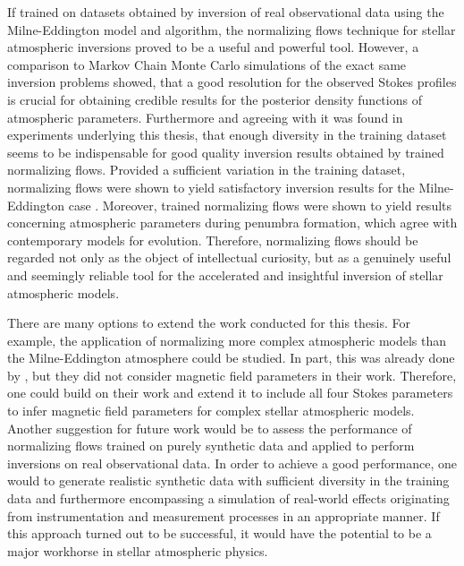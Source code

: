 \documentclass[a4paper,11pt]{report}
\def\fc#1{{\color{black}{#1}}} %
\def\lk#1{{\color{black}{#1}}}
\begin{document}
If trained on datasets obtained by inversion of real observational data using the Milne-Eddington model and algorithm, the normalizing flows technique for stellar atmospheric inversions proved to be a useful and powerful tool. However, a comparison to Markov Chain Monte Carlo simulations of the exact same inversion problems showed, that a good resolution for the observed Stokes profiles is crucial for obtaining credible results for the posterior density functions of atmospheric parameters. Furthermore and agreeing with \cite[p.12]{DiazBaso.2022} it was found in experiments underlying this thesis, that enough diversity in the training dataset seems to be indispensable for good quality inversion results obtained by trained normalizing flows. Provided a sufficient variation in the training dataset, normalizing flows were shown to yield satisfactory inversion results for the Milne-Eddington case \lk{including magnetic field properties}. Moreover, trained normalizing flows were shown to yield results concerning atmospheric parameters during penumbra formation, which agree with contemporary models for \lk{sunspot} evolution. \fc{This is to say, that the magnetic field around umbras indeed tends to gain in inclination over time, eventually becoming roughly perpendicular to the surface normal of the Sun and thus forming a ``ring'' of surface-tangential magnetic field around the umbra.} Therefore, normalizing flows should be regarded not only as the object of intellectual curiosity, but as a genuinely useful and seemingly reliable tool for the accelerated and insightful inversion of stellar atmospheric models.

There are many options to extend the work conducted for this thesis. For example, the application of normalizing \lk{flows to invert} more complex atmospheric models than the Milne-Eddington atmosphere could be studied. In part, this was already done by \cite{DiazBaso.2022}, but they did not consider magnetic field parameters in their work. Therefore, one could build on their work and extend it to include all four Stokes parameters to infer magnetic field parameters for complex stellar atmospheric models. Another suggestion for future work would be to assess the performance of normalizing flows trained on purely synthetic data and applied to perform inversions on real observational data. In order to achieve a good performance, one would \lk{have} to generate realistic synthetic data with sufficient diversity in the training data and furthermore encompassing a simulation of real-world effects originating from instrumentation and measurement processes in an appropriate manner. If this approach turned out to be successful, it would have the potential to be a major workhorse in stellar atmospheric physics.
\end{document}
